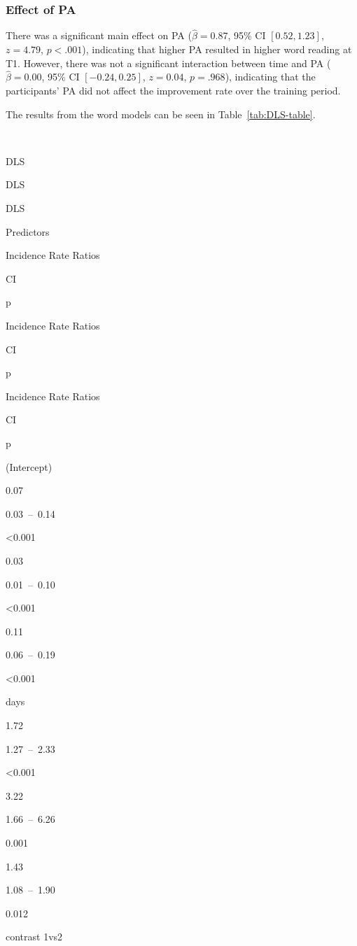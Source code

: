 \documentclass[
  english,
  ,man]{apa6}
\begin{document}
\hypertarget{effect-of-pa-1}{%
\subsubsection{Effect of PA}\label{effect-of-pa-1}}

There was a significant main effect on PA (\(\hat{\beta} = 0.87\), 95\% CI \([0.52, 1.23]\), \(z = 4.79\), \(p < .001\)), indicating that higher PA resulted in higher word reading at T1. However, there was not a significant interaction between time and PA (\(\hat{\beta} = 0.00\), 95\% CI \([-0.24, 0.25]\), \(z = 0.04\), \(p = .968\)), indicating that the participants' PA did not affect the improvement rate over the training period.

The results from the word models can be seen in Table~\ref{tab:DLS-table}.

~

DLS

DLS

DLS

Predictors

Incidence Rate Ratios

CI

p

Incidence Rate Ratios

CI

p

Incidence Rate Ratios

CI

p

(Intercept)

0.07

0.03~--~0.14

\textless0.001

0.03

0.01~--~0.10

\textless0.001

0.11

0.06~--~0.19

\textless0.001

days

1.72

1.27~--~2.33

\textless0.001

3.22

1.66~--~6.26

0.001

1.43

1.08~--~1.90

0.012

contrast 1vs2
\end{document}
